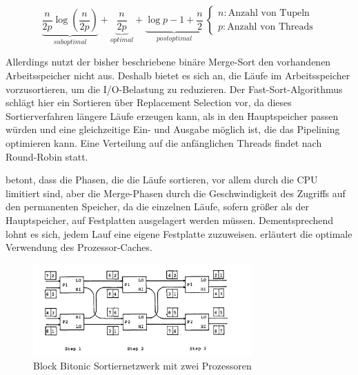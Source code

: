 \documentclass[a4paper,12pt,twoside]{article}
\begin{document}
{\[
\underbrace{\frac{n}{2p} \log \left( \frac{n}{2p} \right)}_{suboptimal} + \underbrace{\frac{n}{2p}}_{optimal} + \underbrace{\log p - 1 + \frac{n}{2}}_{postoptimal} \:
\begin{cases}
n: \text{Anzahl von Tupeln}\\
p: \text{Anzahl von Threads}
\end{cases}
\]

Allerdings nutzt der bisher beschriebene binäre Merge-Sort den vorhandenen Arbeitsspeicher nicht aus. Deshalb bietet es sich an, die Läufe im Arbeitsspeicher vorzusortieren, um die I/O-Belastung zu reduzieren. Der Fast-Sort-Algorithmus \parencite{Tsukerman1986, Salzberg1990} schlägt hier ein Sortieren über Replacement Selection \parencite[vgl.][]{Knuth1973} vor, da dieses Sortierverfahren längere Läufe erzeugen kann, als in den Hauptspeicher passen würden und eine gleichzeitige Ein- und Ausgabe möglich ist, die das Pipelining optimieren kann. Eine Verteilung auf die anfänglichen Threads findet nach Round-Robin statt.

\textcite{Salzberg1990} betont, dass die Phasen, die die Läufe sortieren, vor allem durch die CPU limitiert sind, aber die Merge-Phasen durch die Geschwindigkeit des Zugriffs auf den permanenten Speicher, da die einzelnen Läufe, sofern größer als der Hauptspeicher, auf Festplatten ausgelagert werden müssen. Dementsprechend lohnt es sich, jedem Lauf eine eigene Festplatte zuzuweisen. \textcite{Hao2009} erläutert die optimale Verwendung des Prozessor-Caches.

\begin{figure}
	\centering
	\includegraphics[width=0.75\textwidth]{Bilder/bitonic_block.png}
	\caption{Block Bitonic Sortiernetzwerk mit zwei Prozessoren \parencite[S. 335]{Bitton1983}}
	\label{img:bitonic}
\end{figure}

}
\end{document}
